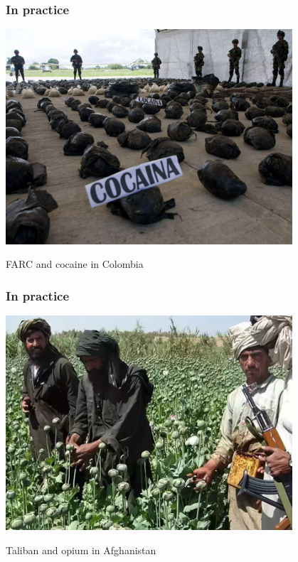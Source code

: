 \documentclass[utf8, xcolor=dvipsnames]{beamer}
\begin{document}
\begin{frame}
\frametitle{In practice}
\centering

\includegraphics[width = 0.8\textwidth]{img/farc}

FARC and cocaine in Colombia

\end{frame}

\begin{frame}
\frametitle{In practice}
\centering

\includegraphics[width = 0.8\textwidth]{img/taliban}

Taliban and opium in Afghanistan

\end{frame}
\end{document}
